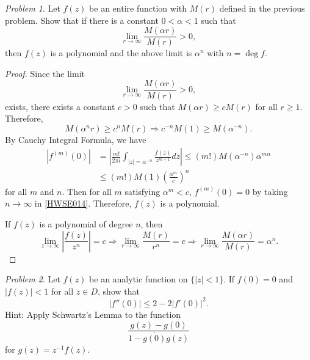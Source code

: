 \documentclass[11pt]{amsart}
\theoremstyle{remark}
\newtheorem{prob}{Problem}[section]
\theoremstyle{definition}
\numberwithin{equation}{section}
\begin{document}
\begin{prob}
    Let $f(z)$ be an entire function with $M(r)$ defined in the previous problem.
    Show that if there is a constant $0 < \alpha < 1$ such that
    \[
        \lim_{r\to\infty} \frac{M(\alpha r)}{M(r)} > 0,
    \]
    then $f(z)$ is a polynomial and the above limit is $\alpha^n$ with $n=\deg f$.
\end{prob}

\begin{proof}
    Since the limit
    \begin{equation}\label{HWSE005}
        \lim_{r\to\infty} \frac{M(\alpha r)}{M(r)} > 0,
    \end{equation}
    exists, there exists a constant $c > 0$ such that
    $M(\alpha r) \ge c M(r)$ for all $r \ge 1$. Therefore,
    \begin{equation}\label{HWSE013}
        M(\alpha^n r) \ge c^n M(r) \Rightarrow c^{-n} M(1) \ge M(\alpha^{-n}).
    \end{equation}
    By Cauchy Integral Formula, we have
    \begin{equation}\label{HWSE014}
        \begin{aligned}
            |f^{(m)}(0)| & = \left|\frac{m!}{2\pi i} \int_{|z| = \alpha^{-n}} \frac{f(z)}{z^{m+1}} dz\right|
            \le (m!) M(\alpha^{-n}) \alpha^{mn}
            \\
                         & \le (m!) M(1) \left(\frac{\alpha^m}{c}\right)^n
        \end{aligned}
    \end{equation}
    for all $m$ and $n$. Then for all $m$ satisfying $\alpha^m < c$, $f^{(m)}(0) = 0$ by taking
    $n\to\infty$ in \eqref{HWSE014}. Therefore, $f(z)$ is a polynomial.

    If $f(z)$ is a polynomial of degree $n$, then
    \begin{equation}\label{HWSE015}
        \lim_{z\to\infty} \left|
        \frac{f(z)}{z^n}
        \right|
        = c \Rightarrow \lim_{r\to\infty}
        \frac{M(r)}{r^n} = c \Rightarrow \lim_{r\to\infty}
        \frac{M(\alpha r)}{M(r)} = \alpha^n.
    \end{equation}
\end{proof}

\begin{prob}
    Let $f(z)$ be an analytic function on $\{|z| < 1\}$. If
    $f(0) = 0$ and $|f(z)| < 1$ for all $z\in D$, show that
    \[
        |f''(0)| \le 2 - 2 |f'(0)|^2.
    \]
    Hint: Apply Schwartz's Lemma to the function
    \[
        \frac{g(z) - g(0)}{1 - \overline{g(0)} g(z)}
    \]
    for $g(z) = z^{-1} f(z)$.
\end{prob}
\end{document}
